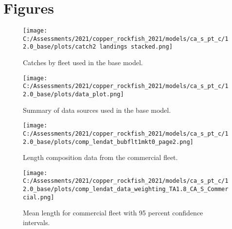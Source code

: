 \documentclass[11pt,
  english,
  a4paper,
]{article}
\begin{document}
\newpage

\clearpage


\hypertarget{figures}{%
\section{Figures}\label{figures}}

\leavevmode\tagmcend\tagstructend


\begin{figure}
\centering
\texttt{[image: C:/Assessments/2021/copper\_rockfish\_2021/models/ca\_s\_pt\_c/12.0\_base/plots/catch2 landings stacked.png]}
\caption{Catches by fleet used in the base model.\label{fig:catch}}
\end{figure}

\tagmcend\tagstructend


\begin{figure}
\centering
\texttt{[image: C:/Assessments/2021/copper\_rockfish\_2021/models/ca\_s\_pt\_c/12.0\_base/plots/data\_plot.png]}
\caption{Summary of data sources used in the base model.\label{fig:data-plot}}
\end{figure}

\tagmcend\tagstructend


\begin{figure}
\centering
\texttt{[image: C:/Assessments/2021/copper\_rockfish\_2021/models/ca\_s\_pt\_c/12.0\_base/plots/comp\_lendat\_bubflt1mkt0\_page2.png]}
\caption{Length composition data from the commercial fleet.\label{fig:com-len-data}}
\end{figure}

\tagmcend\tagstructend


\begin{figure}
\centering
\texttt{[image: C:/Assessments/2021/copper\_rockfish\_2021/models/ca\_s\_pt\_c/12.0\_base/plots/comp\_lendat\_data\_weighting\_TA1.8\_CA\_S\_Commercial.png]}
\caption{Mean length for commercial fleet with 95 percent confidence intervals.\label{fig:mean-com-len-data}}
\end{figure}
\end{document}
